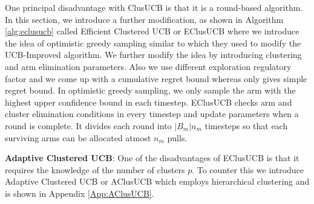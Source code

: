 One principal disadvantage with ClusUCB is that it is a round-based algorithm. %
In this section, we introduce a further modification, as shown in Algorithm \ref{alg:eclusucb} called Efficient Clustered UCB or EClusUCB where we introduce the idea of optimistic greedy sampling similar to \citet{liu2016modification} which they used to modify the UCB-Improved algorithm. We further modify the idea by introducing clustering and arm elimination parameters. Also we use different exploration regulatory factor and we come up with a cumulative regret bound whereas \citet{liu2016modification} only gives simple regret bound. In optimistic greedy sampling, we only sample the arm with the highest upper confidence bound in each timestep. EClusUCB checks arm and cluster elimination conditions in every timestep and update parameters when a round is complete. It divides each round into $|B_{m}|n_{m}$ timesteps so that each surviving arms can be allocated atmost $n_{m}$ pulls. 

\textbf{Adaptive Clustered UCB}: One of the disadvantages of EClusUCB is that it requires the knowledge of the number of clusters $p$. To counter this we introduce Adaptive Clustered UCB or AClusUCB which employs hierarchical clustering and is shown in Appendix \ref{App:AClusUCB}.
